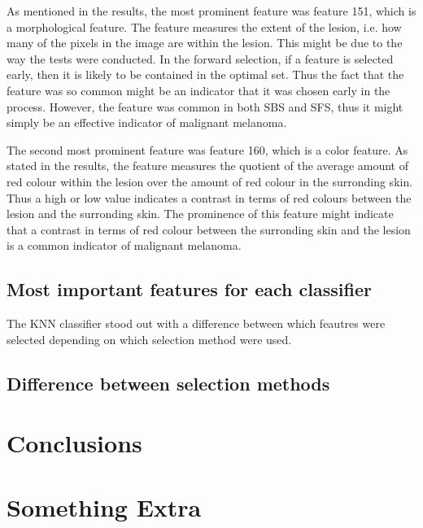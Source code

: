 \documentclass{kththesis}
\begin{document}
As mentioned in the results, the most prominent feature was feature 151, which is a morphological feature. The feature measures the extent of the lesion, i.e. how many of the pixels in the image are within the lesion. This might be due to the way the tests were conducted. In the forward selection, if a feature is selected early, then it is likely to be contained in the optimal set. Thus the fact that the feature was so common might be an indicator that it was chosen early in the process. However, the feature was common in both SBS and SFS, thus it might simply be an effective indicator of malignant melanoma.

The second most prominent feature was feature 160, which is a color feature. As stated in the results, the feature measures the quotient of the average amount of red colour within the lesion over the amount of red colour in the surronding skin. Thus a high or low value indicates a contrast in terms of red colours between the lesion and the surronding skin. The prominence of this feature might indicate that a contrast in terms of red colour between the surronding skin and the lesion is a common indicator of malignant melanoma. %



\section{Most important features for each classifier}


The KNN classifier stood out with a difference between which feautres were selected depending on which selection method were used. %


\section{Difference between selection methods}



\chapter{Conclusions}
\blindtext

\printbibliography[heading=bibintoc]

\appendix

\chapter{Something Extra}

\tailmatter
\end{document}
